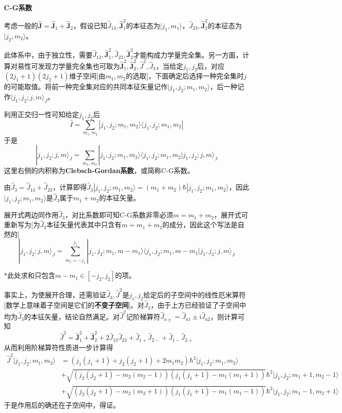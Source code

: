 \documentclass[a4paper,UTF8,fontset=windows]{ctexart}
\newcommand*{\ir}{\mathrm{i}}
\newcommand*{\ket}[1]{|#1\rangle}
\newcommand*{\bra}[1]{\langle#1|}
\newcommand*{\bk}[2]{\langle#1|#2\rangle}
\newcommand*{\bj}{\mathbf{J}}
\begin{document}
\

\textbf{C-G系数}

考虑一般的$\hat{\bj}=\hat{\bj}_1+\hat{\bj}_2$，假设已知$\hat{J}_{13},\hat{\bj}_1^2$的本征态为$\ket{j_1,m_1}$，$\hat{J}_{23},\hat{\bj}_2^2$的本征态为$\ket{j_2,m_2}$。

此体系中，由于独立性，需要$\hat{J}_{13},\hat{\bj}_1^2,\hat{J}_{23},\hat{\bj}_2^2$才能构成力学量完全集。另一方面，计算对易性可发现力学量完全集也可取为$\hat{\bj}_1^2,\hat{\bj}_2^2,\hat{J}^2,\hat{J}_3$，当给定$j_1,j_2$后，对应$(2j_1+1)(2j_2+1)$维子空间[由$m_1,m_2$的选取]，下面确定后选择一种完全集时$j$的可能取值。将前一种完全集对应的共同本征矢量记作$\ket{j_1,j_2;m_1,m_2}$，后一种记作$\ket{j_1,j_2;j,m}_J$。

利用正交归一性可知给定$j_1,j_2$后
$$\hat{I}=\sum_{m_1,m_2}\ket{j_1,j_2;m_1,m_2}\bra{j_1,j_2;m_1,m_2}$$
于是
$$\ket{j_1,j_2;j,m}_J=\sum_{m_1,m_2}\ket{j_1,j_2;m_1,m_2}\bk{j_1,j_2;m_1,m_2}{j_1,j_2;j,m}_J$$
这里右侧的内积称为\textbf{Clebsch-Gordan系数}，或简称C-G系数。

由$\hat{J}_3=\hat{J}_{13}+\hat{J}_{23}$，计算即得$\hat{J}_3\ket{j_1,j_2;m_1,m_2}=(m_1+m_2)\hbar\ket{j_1,j_2;m_1,m_2}$，因此$\ket{j_1,j_2;m_1,m_2}$是$\hat{J}_3$属于$m_1+m_2$的本征矢量。

展开式两边同作用$\hat{J}_3$，对比系数即可知C-G系数非零必须$m=m_1+m_2$，展开式可重新写为[为$\hat{J}_3$本征矢量代表其中只含有$m=m_1+m_2$的成分，因此这个写法是自然的]
$$\ket{j_1,j_2;j,m}_J=\sum_{m_1=-j_1}^{j_1}\ket{j_1,j_2;m_1,m-m_1}\bk{j_1,j_2;m_1,m-m_1}{j_1,j_2;j,m}_J$$

*此处求和只包含$m-m_1\in[-j_2,j_2]$的项。

事实上，为使展开合理，还需验证$\hat{J}_3,\hat{J}^2$是$j_1,j_2$给定后的子空间中的线性厄米算符[数学上意味着子空间是它们的\textbf{不变子空间}]。对$\hat{J}_3$，由于上方已经验证了子空间中均为$\hat{J}_3$的本征矢量，结论自然满足。对$\hat{J}^2$记阶梯算符$\hat{J}_{a\pm}=\hat{J}_{a1}\pm\ir\hat{J}_{a2}$，则计算可知
$$\hat{J}^2=\hat{\bj}_1^2+\hat{\bj}_2^2+2\hat{J}_{13}\hat{J}_{23}+\hat{J}_{1+}\hat{J}_{2-}+\hat{J}_{1-}\hat{J}_{2+}$$
从而利用阶梯算符性质进一步计算得
$$\begin{aligned}\hat{J}^2\ket{j_1,j_2;m_1,m_2}&=(j_1(j_1+1)+j_2(j_2+1)+2m_1m_2)\hbar^2\ket{j_1,j_2;m_1,m_2}\\ &+\sqrt{(j_2(j_2+1)-m_2(m_2-1))(j_1(j_1+1)-m_1(m_1+1))}\hbar^2\ket{j_1,j_2;m_1+1,m_2-1}\\ &+\sqrt{(j_2(j_2+1)-m_2(m_2+1))(j_1(j_1+1)-m_1(m_1-1))}\hbar^2\ket{j_1,j_2;m_1-1,m_2+1}\end{aligned}$$
于是作用后的确还在子空间中，得证。
\end{document}
